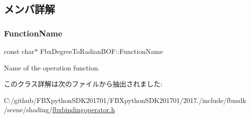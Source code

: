 \subsection{メンバ詳解}
\mbox{\label{class_fbx_degree_to_radian_b_o_f_a5a082cbbb422d50fdc37dabab272caba}} 
\subsubsection{\texorpdfstring{Function\+Name}{FunctionName}}
{\footnotesize\ttfamily const char$\ast$ Fbx\+Degree\+To\+Radian\+B\+O\+F\+::\+Function\+Name\hspace{0.3cm}{\ttfamily [static]}}



Name of the operation function. 



このクラス詳解は次のファイルから抽出されました\+:\begin{DoxyCompactItemize}
\item 
C\+:/github/\+F\+B\+Xpython\+S\+D\+K201701/\+F\+B\+Xpython\+S\+D\+K201701/2017./include/fbxsdk/scene/shading/\hyperlink{fbxbindingoperator_8h}{fbxbindingoperator.\+h}\end{DoxyCompactItemize}
